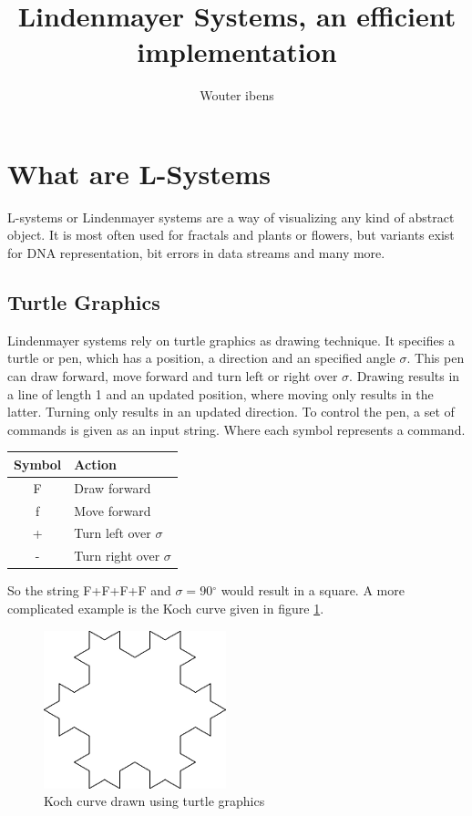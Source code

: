 \documentclass[11pt,a4paper]{article}
\author{Wouter ibens}
\title{Lindenmayer Systems, an efficient implementation}
\newcommand{\degree}{\ensuremath{^\circ}}
\begin{document}
\maketitle
\tableofcontents
\newpage
\section{What are L-Systems}
L-systems or Lindenmayer systems are a way of visualizing any kind of abstract object. It is most often used for fractals and plants or flowers, but variants exist for DNA representation, bit errors in data streams and many more.

\subsection{Turtle Graphics}
Lindenmayer systems rely on turtle graphics as drawing technique. It specifies a turtle or pen, which has a position, a direction and an specified angle $\sigma$. This pen can draw forward, move forward and turn left or right over $\sigma$. Drawing results in a line of length 1 and an updated position, where moving only results in the latter. Turning only results in an updated direction.
To control the pen, a set of commands is given as an input string. Where each symbol represents a command.
\begin{center}
\begin{tabular}{c | l}
Symbol & Action \\ \hline
F & Draw forward \\
f & Move forward \\
+ & Turn left over $\sigma$ \\
- & Turn right over $\sigma$
\end{tabular}
\end{center}

So the string F+F+F+F and $\sigma = 90\degree$ would result in a square. A more complicated example is the Koch curve given in figure \ref{fig:koch}.
\begin{figure}[h!]
  \centering
  \includegraphics[]{koch.png}
  \caption{Koch curve drawn using turtle graphics}
  \label{fig:koch}
\end{figure}
\end{document}
